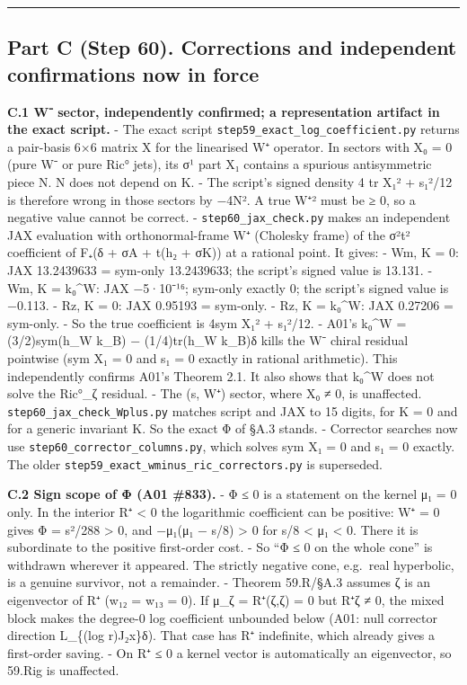 \documentclass[
  10pt,
]{report}
\begin{document}
\begin{center}\rule{0.5\linewidth}{0.5pt}\end{center}

\hypertarget{part-c-step-60.-corrections-and-independent-confirmations-now-in-force}{%
\subsection{Part C (Step 60). Corrections and independent confirmations
now in
force}\label{part-c-step-60.-corrections-and-independent-confirmations-now-in-force}}

\textbf{C.1 W⁻ sector, independently confirmed; a representation
artifact in the exact script.} - The exact script
\texttt{step59\_exact\_log\_coefficient.py} returns a pair-basis 6×6
matrix X for the linearised W⁺ operator. In sectors with X₀ = 0 (pure W⁻
or pure Ric° jets), its σ¹ part X₁ contains a spurious antisymmetric
piece N. N does not depend on K. - The script's signed density 4 tr X₁²
+ s₁²/12 is therefore wrong in those sectors by −4\textbar N\textbar². A
true \textbar W⁺\textbar² must be ≥ 0, so a negative value cannot be
correct. - \texttt{step60\_jax\_check.py} makes an independent JAX
evaluation with orthonormal-frame W⁺ (Cholesky frame) of the σ²t²
coefficient of F₊(δ + σA + t(h₂ + σK)) at a rational point. It gives: -
Wm, K = 0: JAX 13.2439633 = sym-only 13.2439633; the script's signed
value is 13.131. - Wm, K = k₀\^{}W: JAX −5·10⁻¹⁶; sym-only exactly 0;
the script's signed value is −0.113. - Rz, K = 0: JAX 0.95193 =
sym-only. - Rz, K = k₀\^{}W: JAX 0.27206 = sym-only. - So the true
coefficient is 4\textbar sym X₁\textbar² + s₁²/12. - A01's k₀\^{}W =
(3/2)sym(h\_W k\_B) − (1/4)tr(h\_W k\_B)δ kills the W⁻ chiral residual
pointwise (sym X₁ = 0 and s₁ = 0 exactly in rational arithmetic). This
independently confirms A01's Theorem 2.1. It also shows that k₀\^{}W
does not solve the Ric°\_ζ residual. - The (s, W⁺) sector, where X₀ ≠ 0,
is unaffected. \texttt{step60\_jax\_check\_Wplus.py} matches script and
JAX to 15 digits, for K = 0 and for a generic invariant K. So the exact
Φ of §A.3 stands. - Corrector searches now use
\texttt{step60\_corrector\_columns.py}, which solves sym X₁ = 0 and s₁ =
0 exactly. The older \texttt{step59\_exact\_wminus\_ric\_correctors.py}
is superseded.

\textbf{C.2 Sign scope of Φ (A01 \#833).} - Φ ≤ 0 is a statement on the
kernel μ₁ = 0 only. In the interior R⁺ \textless{} 0 the logarithmic
coefficient can be positive: W⁺ = 0 gives Φ = s²/288 \textgreater{} 0,
and −μ₁(μ₁ − s/8) \textgreater{} 0 for s/8 \textless{} μ₁ \textless{} 0.
There it is subordinate to the positive first-order cost. - So ``Φ ≤ 0
on the whole cone'' is withdrawn wherever it appeared. The strictly
negative cone, e.g.~real hyperbolic, is a genuine survivor, not a
remainder. - Theorem 59.R/§A.3 assumes ζ is an eigenvector of R⁺ (w₁₂ =
w₁₃ = 0). If μ\_ζ = R⁺(ζ,ζ) = 0 but R⁺ζ ≠ 0, the mixed block makes the
degree-0 log coefficient unbounded below (A01: null corrector direction
L\_\{(log r)J₂x\}δ). That case has R⁺ indefinite, which already gives a
first-order saving. - On R⁺ ≤ 0 a kernel vector is automatically an
eigenvector, so 59.Rig is unaffected.
\end{document}

